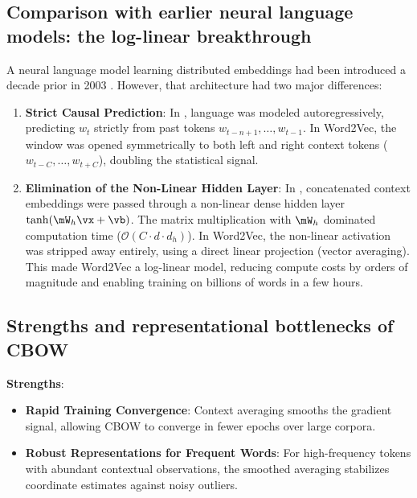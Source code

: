 \documentclass[../../main.tex]{subfiles}
\begin{document}
\subsection{Comparison with earlier neural language models: the log-linear breakthrough}
\label{subsec:bengio_vs_mikolov}

A neural language model learning distributed embeddings had been introduced a decade prior in 2003 \cite{bengio2003}. However, that architecture had two major differences:
\begin{enumerate}
    \item \textbf{Strict Causal Prediction}: In \cite{bengio2003}, language was modeled autoregressively, predicting $w_t$ strictly from past tokens $w_{t-n+1}, \dots, w_{t-1}$. In Word2Vec, the window was opened symmetrically to both left and right context tokens ($w_{t-C}, \dots, w_{t+C}$), doubling the statistical signal.
    \item \textbf{Elimination of the Non-Linear Hidden Layer}: In \cite{bengio2003}, concatenated context embeddings were passed through a non-linear dense hidden layer $\tanh(\mW_h \vx + \vb)$. The matrix multiplication with $\mW_h$ dominated computation time ($\mathcal{O}(C \cdot d \cdot d_h)$). In Word2Vec, the non-linear activation was stripped away entirely, using a direct linear projection (vector averaging). This made Word2Vec a log-linear model, reducing compute costs by orders of magnitude and enabling training on billions of words in a few hours.
\end{enumerate}

\subsection{Strengths and representational bottlenecks of CBOW}
\label{subsec:cbow_bottlenecks}

\noindent\textbf{Strengths}:
\begin{itemize}
    \item \textbf{Rapid Training Convergence}: Context averaging smooths the gradient signal, allowing CBOW to converge in fewer epochs over large corpora.
    \item \textbf{Robust Representations for Frequent Words}: For high-frequency tokens with abundant contextual observations, the smoothed averaging stabilizes coordinate estimates against noisy outliers.
\end{itemize}
\end{document}
